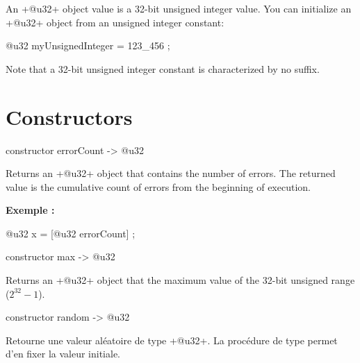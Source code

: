 



An \ggsq+@u32+ object value is a 32-bit unsigned integer value. You can initialize an \ggsq+@u32+ object from an unsigned integer constant:\\

\begin{galgas4}
@u32 myUnsignedInteger = 123_456 ;
\end{galgas4}

Note that a 32-bit unsigned integer constant is characterized by no suffix.

\section{Constructors}


\begin{galgas4}
constructor errorCount -> @u32
\end{galgas4}


Returns an \ggsq+@u32+ object that contains the number of errors. The returned value is the cumulative count of errors from the beginning of execution.

\textbf{Exemple :}
\begin{galgas4}
@u32 x = [@u32 errorCount] ;
\end{galgas4}





\begin{galgas4}
constructor max -> @u32
\end{galgas4}

Returns an \ggsq+@u32+ object that the maximum value of the 32-bit unsigned range ($2^{32}-1$).







\begin{galgas4}
constructor random -> @u32
\end{galgas4}

Retourne une valeur aléatoire de type \ggsq+@u32+. La procédure de type  permet d'en fixer la valeur initiale.

